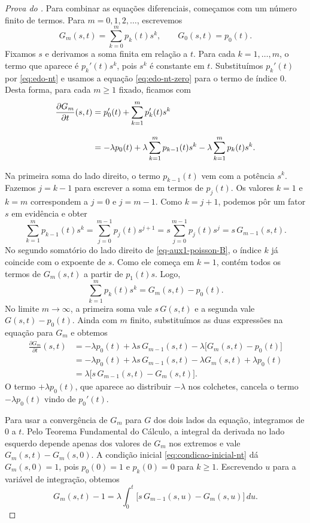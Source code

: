 \documentclass[12pt,portuguese]{article}
\theoremstyle{definition}
\theoremstyle{plainexercise}
\theoremstyle{starredexercise}
\theoremstyle{definition}
\begin{document}
\begin{proof}[Prova do ]
Para combinar as equações diferenciais, começamos com um número finito
de termos. Para $m=0,1,2,\ldots$, escrevemos
\[
  G_m(s,t)=\sum_{k=0}^{m}p_k(t)s^k,\qquad G_0(s,t)=p_0(t).
\]
Fixamos $s$ e derivamos a soma finita em relação a $t$. Para cada
$k=1,\ldots,m$, o termo que aparece é $p_k'(t)s^k$, pois $s^k$ é
constante em $t$. Substituímos $p_k'(t)$ por \eqref{eq:edo-nt} e usamos
a equação \eqref{eq:edo-nt-zero} para o termo de índice $0$. 
Desta forma, para cada $m\geqslant1$ fixado, ficamos com
\begin{align}\label{eq-aux1-poisson-B}
  \frac{\partial G_m}{\partial t}(s,t)
  &=p_0'(t)+\sum_{k=1}^{m}p_k'(t)s^k
  \notag\\[0.3cm]
  &=-\lambda p_0(t)
    +\lambda\sum_{k=1}^{m}p_{k-1}(t)s^k
    -\lambda\sum_{k=1}^{m}p_k(t)s^k.
\end{align}

Na primeira soma do lado direito, o termo $p_{k-1}(t)$ vem com a
potência $s^k$. Fazemos $j=k-1$ para escrever a soma em termos de $p_j(t)$.
Os valores $k=1$ e $k=m$ correspondem a $j=0$ e $j=m-1$. Como $k=j+1$,
podemos pôr um fator $s$ em evidência e obter
\[
  \sum_{k=1}^{m}p_{k-1}(t)s^k
  =\sum_{j=0}^{m-1}p_j(t)s^{j+1}
  =s\sum_{j=0}^{m-1}p_j(t)s^j
  =s\,G_{m-1}(s,t).
\]
No segundo somatório do lado direito de \eqref{eq-aux1-poisson-B}, o índice $k$
já coincide com o expoente de $s$. Como ele começa em $k=1$, contém todos os
termos de $G_m(s,t)$ a partir de $p_1(t)s$. Logo,
\[
  \sum_{k=1}^{m}p_k(t)s^k=G_m(s,t)-p_0(t).
\]
No limite $m\to\infty$, a primeira soma vale $s\,G(s,t)$ e a segunda
vale $G(s,t)-p_0(t)$. Ainda com $m$ finito, substituímos as duas
expressões na equação para $G_m$ e obtemos
\begin{align*}
  \frac{\partial G_m}{\partial t}(s,t)
  &=-\lambda p_0(t)+\lambda s\,G_{m-1}(s,t)
    -\lambda\bigl[G_m(s,t)-p_0(t)\bigr]\\
  &=-\lambda p_0(t)+\lambda s\,G_{m-1}(s,t)
    -\lambda G_m(s,t)+\lambda p_0(t)\\
  &=\lambda\bigl[s\,G_{m-1}(s,t)-G_m(s,t)\bigr].
\end{align*}
O termo $+\lambda p_0(t)$, que aparece ao distribuir $-\lambda$ nos
colchetes, cancela o termo $-\lambda p_0(t)$ vindo de $p_0'(t)$.

Para usar a convergência de $G_m$ para $G$ dos dois lados da equação,
integramos de $0$ a $t$. Pelo Teorema Fundamental do Cálculo, a integral
da derivada no lado esquerdo depende apenas dos valores de $G_m$ nos
extremos e vale $G_m(s,t)-G_m(s,0)$. A condição inicial
\eqref{eq:condicao-inicial-nt} dá $G_m(s,0)=1$, pois $p_0(0)=1$ e
$p_k(0)=0$ para $k\geqslant1$. Escrevendo $u$ para a variável de integração,
obtemos
\[
  G_m(s,t)-1
  =\lambda\int_0^t\bigl[s\,G_{m-1}(s,u)-G_m(s,u)\bigr]\,du.
\]


\end{proof}
\end{document}
